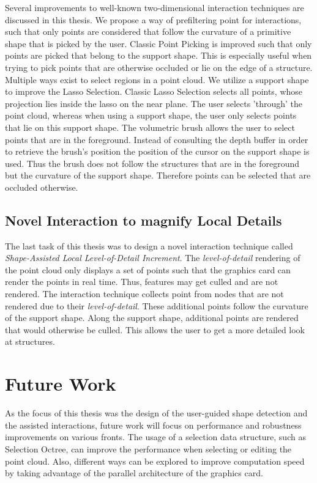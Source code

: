 Several improvements to well-known two-dimensional interaction techniques are discussed in this thesis. We propose a way of prefiltering point for interactions, such that only points are considered that follow the curvature of a primitive shape that is picked by the user. Classic Point Picking is improved such that only points are picked that belong to the support shape. This is especially useful when trying to pick points that are otherwise occluded or lie on the edge of a structure. Multiple ways exist to select regions in a point cloud. We utilize a support shape to improve the Lasso Selection. Classic Lasso Selection selects all points, whose projection lies inside the lasso on the near plane. The user selects 'through' the point cloud, whereas when using a support shape, the user only selects points that lie on this support shape. The volumetric brush allows the user to select points that are in the foreground. Instead of consulting the depth buffer in order to retrieve the brush's position the position of the cursor on the support shape is used. Thus the brush does not follow the structures that are in the foreground but the curvature of the support shape. Therefore points can be selected that are occluded otherwise. 


\subsection{Novel Interaction to magnify Local Details}

The last task of this thesis was to design a novel interaction technique called \textit{Shape-Assisted Local Level-of-Detail Increment}. The \textit{level-of-detail} rendering of the point cloud only displays a set of points such that the graphics card can render the points in real time. Thus, features may get culled and are not rendered. The interaction technique collects point from nodes that are not rendered due to their \textit{level-of-detail}. These additional points follow the curvature of the support shape. Along the support shape, additional points are rendered that would otherwise be culled. This allows the user to get a more detailed look at structures. 


\section{Future Work}

As the focus of this thesis was the design of the user-guided shape detection and the assisted interactions, future work will focus on performance and robustness improvements on various fronts. The usage of a selection data structure, such as Selection Octree\cite{scheiblauer2011out}, can improve the performance when selecting or editing the point cloud. Also, different ways can be explored to improve computation speed by taking advantage of the parallel architecture of the graphics card. 
\\

